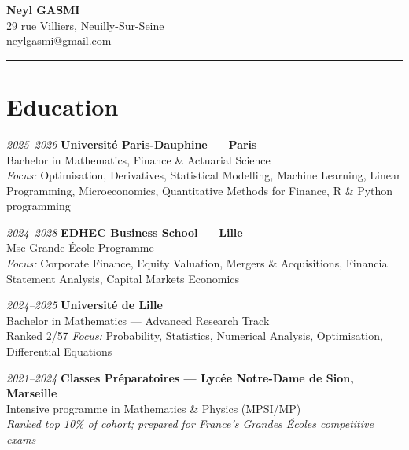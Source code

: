 \documentclass[a4paper,10pt]{article}
\begin{document}
\sloppy

\begin{flushleft}
    {\Large \textbf{Neyl GASMI}} \\[0.2em]
    {\small 29 rue Villiers, Neuilly-Sur-Seine  \\
    \href{mailto:neylgasmi@gmail.com}{neylgasmi@gmail.com}} \\
\end{flushleft}



\vspace{0.5em}

\hrule
\vspace{1em}

\begin{minipage}[t]{0.45\textwidth}


\section*{Education}

\textit{2025–2026} \textbf{Université Paris-Dauphine — Paris} \\
Bachelor in Mathematics, Finance \& Actuarial Science \\
\textit{Focus:} Optimisation, Derivatives, Statistical Modelling, Machine Learning, Linear Programming, Microeconomics, Quantitative Methods for Finance, R \& Python programming

\vspace{0.8em}

\textit{2024–2028} \textbf{EDHEC Business School — Lille} \\
Msc Grande École Programme  \\
\textit{Focus:} Corporate Finance, Equity Valuation, Mergers \& Acquisitions, Financial Statement Analysis, Capital Markets Economics

\vspace{0.8em}

\textit{2024–2025} \textbf{Université de Lille} \\
Bachelor in Mathematics — Advanced Research Track \\
Ranked 2/57
\textit{Focus:} Probability, Statistics, Numerical Analysis, Optimisation, Differential Equations

\vspace{0.8em}

\textit{2021–2024} \textbf{Classes Préparatoires — Lycée Notre-Dame de Sion, Marseille} \\
Intensive programme in Mathematics \& Physics (MPSI/MP) \\
\textit{Ranked top 10\% of cohort; prepared for France’s Grandes Écoles competitive exams}


\end{minipage}
\end{document}
